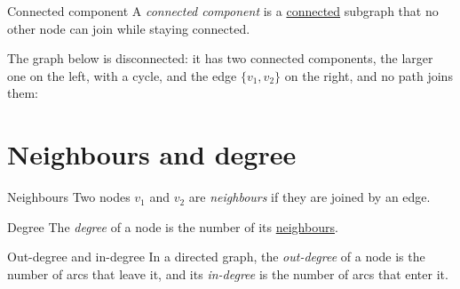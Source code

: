 \documentclass[a4paper,12pt,oneside]{report}
\begin{document}
\begin{frameddefn}{Connected component}
\label{def:connected-component}
A \emph{connected component} is a
\hyperref[def:connected-graph]{connected} subgraph that no other node
can join while staying connected.
\end{frameddefn}

The graph below is disconnected: it has two connected components, the
larger one on the left, with a cycle, and the edge $\{v_1,v_2\}$ on
the right, and no path joins them:
\begin{center}
\end{center}

\section{Neighbours and degree}
\label{sec:graph-degree}

\begin{frameddefn}{Neighbours}\label{def:neighbours}
Two nodes $v_1$ and $v_2$ are \emph{neighbours} if they are joined by
an edge.
\end{frameddefn}

\begin{frameddefn}{Degree}\label{def:degree}
The \emph{degree} of a node is the number of its
\hyperref[def:neighbours]{neighbours}.
\end{frameddefn}

\begin{frameddefn}{Out-degree and in-degree}\label{def:in-out-degree}
In a directed graph, the \emph{out-degree} of a node is the number of
arcs that leave it, and its \emph{in-degree} is the number of arcs
that enter it.
\end{frameddefn}
\end{document}
